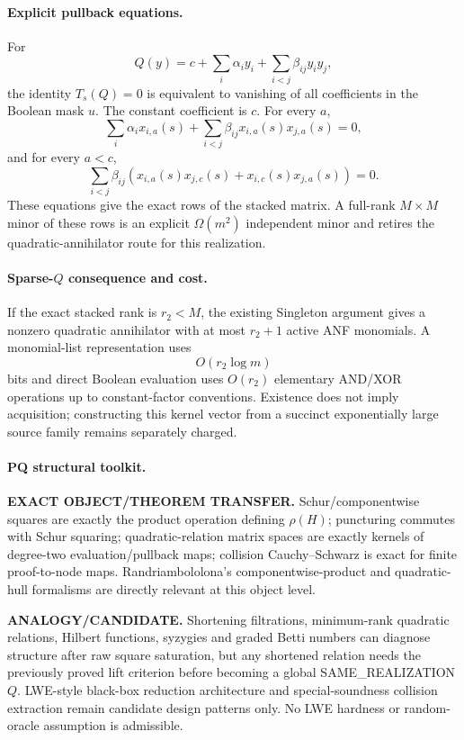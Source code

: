 \documentclass[11pt]{article}
\begin{document}
\paragraph{Explicit pullback equations.}
For
\[
Q(y)=c+\sum_i\alpha_i y_i+\sum_{i<j}\beta_{ij}y_iy_j,
\]
the identity \(T_s(Q)=0\) is equivalent to vanishing of all coefficients in the Boolean mask \(u\). The constant coefficient is \(c\). For every \(a\),
\[
\sum_i\alpha_i x_{i,a}(s)
+
\sum_{i<j}\beta_{ij}x_{i,a}(s)x_{j,a}(s)=0,
\]
and for every \(a<c\),
\[
\sum_{i<j}\beta_{ij}
\left(
x_{i,a}(s)x_{j,c}(s)+x_{i,c}(s)x_{j,a}(s)
\right)=0.
\]
These equations give the exact rows of the stacked matrix. A full-rank \(M\times M\) minor of these rows is an explicit \(\Omega(m^2)\) independent minor and retires the quadratic-annihilator route for this realization.

\paragraph{Sparse-\(Q\) consequence and cost.}
If the exact stacked rank is \(r_2<M\), the existing Singleton argument gives a nonzero quadratic annihilator with at most \(r_2+1\) active ANF monomials. A monomial-list representation uses
\[
O(r_2\log m)
\]
bits and direct Boolean evaluation uses \(O(r_2)\) elementary AND/XOR operations up to constant-factor conventions. Existence does not imply acquisition; constructing this kernel vector from a succinct exponentially large source family remains separately charged.

\paragraph{PQ structural toolkit.}
\textbf{EXACT OBJECT/THEOREM TRANSFER.}
Schur/componentwise squares are exactly the product operation defining \(\rho(H)\); puncturing commutes with Schur squaring; quadratic-relation matrix spaces are exactly kernels of degree-two evaluation/pullback maps; collision Cauchy--Schwarz is exact for finite proof-to-node maps. Randriambololona's componentwise-product and quadratic-hull formalisms are directly relevant at this object level.

\textbf{ANALOGY/CANDIDATE.}
Shortening filtrations, minimum-rank quadratic relations, Hilbert functions, syzygies and graded Betti numbers can diagnose structure after raw square saturation, but any shortened relation needs the previously proved lift criterion before becoming a global SAME\_REALIZATION \(Q\). LWE-style black-box reduction architecture and special-soundness collision extraction remain candidate design patterns only. No LWE hardness or random-oracle assumption is admissible.
\end{document}
